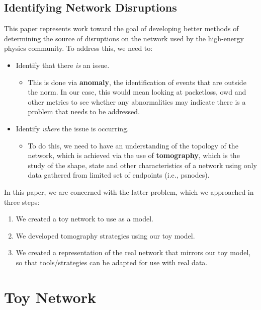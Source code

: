 \documentclass{finalreport}
\begin{document}
\subsection*{Identifying Network Disruptions}

This paper represents work toward the goal of developing better methods of determining the source of disruptions on the network used by the high-energy physics community. To address this, we need to:

\begin{itemize}
	\item Identify that there \textit{is} an issue. 
	\begin{itemize}
		\item This is done via \textbf{\gls{anomaly}}, the identification of events that are outside the norm. In our case, this would mean looking at \gls{packetloss}, \gls{owd} and other metrics to see whether any abnormalities may indicate there is a problem that needs to be addressed.
	\end{itemize}
	\item Identify \textit{where} the issue is occurring. 
	\begin{itemize}
		\item To do this, we need to have an understanding of the topology of the network, which is achieved via the use of \textbf{\gls{tomography}}, which is the study of the shape, state and other characteristics of a network using only data gathered from limited set of \glspl{endpoint} (i.e., \glspl{psnode}).
	\end{itemize}
	
\end{itemize}

\noindent In this paper, we are concerned with the latter problem, which we approached in three steps:

\begin{enumerate}
	\item We created a toy network to use as a model.
	\item We developed \gls{tomography} strategies using our toy model.
	\item We created a representation of the real network that mirrors our toy model, so that tools/strategies can be adapted for use with real data.
\end{enumerate}

\section{Toy Network}
\end{document}
